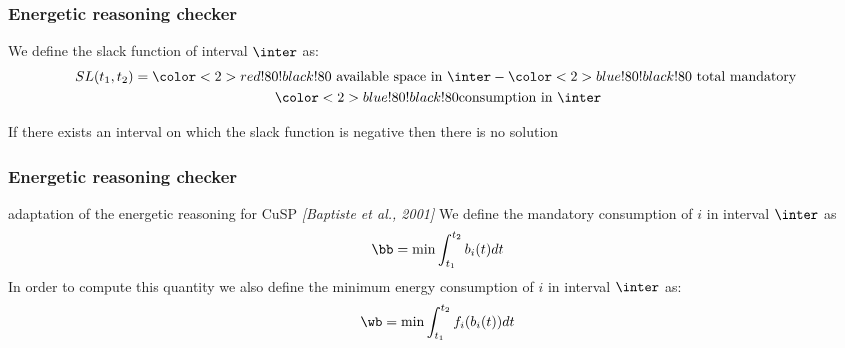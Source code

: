 \begin{frame}
  \frametitle{Energetic reasoning checker}
  We define the  slack function of interval $\inter$ as:
  \begin{gather}
    SL(t_1,t_2)={\color<2>{red!80!black!80}\text{ available space in
      }\inter}-{\color<2>{blue!80!black!80}\text{ total mandatory }} \nonumber\\ 
    {\color<2>{blue!80!black!80}\text{consumption in } \inter}\nonumber
  \end{gather}
  \begin{theorem}
    If there exists an interval on which the slack function is negative then there is no solution
  \end{theorem}
  \vfill
\end{frame}

\begin{frame}
  \frametitle{Energetic reasoning checker}
  {\small adaptation of the energetic reasoning for CuSP {\color{gray!50!black!50} \it [Baptiste et al., 2001]}}
  \vfill
  We define the mandatory consumption of $i$ in interval $\inter$ as 
  \[\bb=\min \int_{t_1}^{t_2} b_i(t) dt\]
  \vfill
  In order to compute this quantity we also define the minimum energy
  consumption of $i$ in interval $\inter$ as:
  \[\wb=\min \int_{t_1}^{t_2} f_i(b_i(t)) dt\]
\end{frame}


